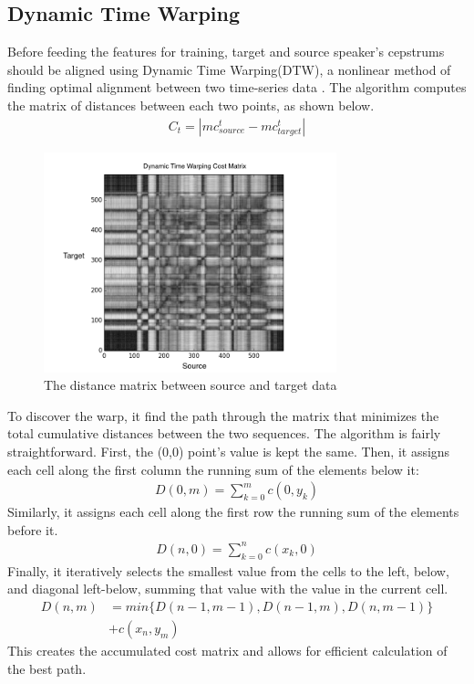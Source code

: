 \subsection{Dynamic Time Warping}

Before feeding the features for training, target and source speaker's cepstrums should be aligned using Dynamic Time Warping(DTW), a nonlinear method of finding optimal alignment between two time-series data \cite{ratanamahatana2004everything}. The algorithm computes the matrix of distances between each two points, as shown below.
\begin{align*}
C_t = |mc^t_{source} - mc^t_{target}|
\end{align*}

\begin{figure}[htb]

\begin{minipage}[b]{1.0\linewidth}
  \centering
  \centerline{\includegraphics[width=8.5cm]{image9}}
\end{minipage}
\caption{The distance matrix between source and target data}
\label{fig:costmatrix}
%
\end{figure}

To discover the warp, it find the path through the matrix that minimizes the total cumulative distances between the two sequences. The algorithm is fairly straightforward. First, the (0,0) point’s value is kept the same. Then, it assigns each cell along the first column the running sum of the elements below it:
\begin{align*}
    D(0,m) = \sum_{k=0}^m c(0,y_k)
\end{align*}
Similarly, it assigns each cell along the first row the running sum of the elements before it.
\begin{align*}
    D(n,0) = \sum_{k=0}^n c(x_k,0)
\end{align*}
Finally, it iteratively selects the smallest value from the cells to the left, below, and diagonal left-below, summing that value with the value in the current cell.
\begin{align*}
    D(n,m) &= min\{D(n-1,m-1),D(n-1,m),D(n,m-1)\} \\
    &+c(x_n,y_m)
\end{align*}
This creates the accumulated cost matrix and allows for efficient calculation of the best path.

